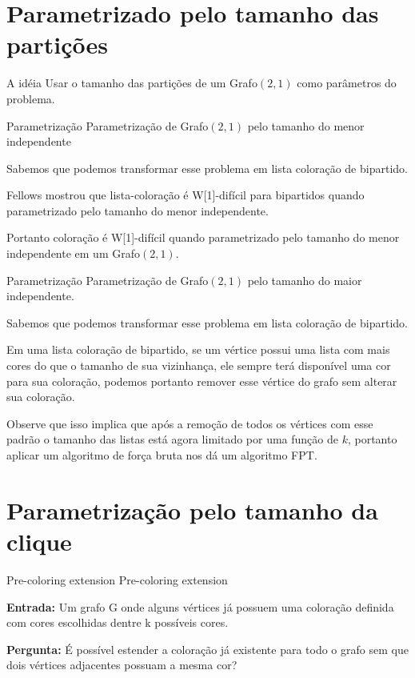 \documentclass[9pt, compress]{beamer}
\newcommand{\?}{\textcolor{warn}{\textit{?}}}
\begin{document}
    \section{Parametrizado pelo tamanho das partições}
    \begin{frame}{A idéia}
          Usar o tamanho das partições de um Grafo$(2,1)$ como parâmetros do problema.
    \end{frame}
    \begin{frame}{Parametrização}
      \large{Parametrização de Grafo$(2,1)$ pelo tamanho do menor independente}
      \normalsize\newline\newline
            
      Sabemos que podemos transformar esse problema em lista coloração de bipartido.
      
      Fellows mostrou que lista-coloração é W[1]-difícil para bipartidos quando parametrizado pelo tamanho do menor independente.
      
      Portanto coloração é W[1]-difícil quando parametrizado pelo tamanho do menor independente em um Grafo$(2,1)$.
    \end{frame}
    \begin{frame}{Parametrização}
    \large{Parametrização de Grafo$(2,1)$ pelo tamanho do maior independente.}
      \normalsize\newline\newline
            
      Sabemos que podemos transformar esse problema em lista coloração de bipartido.
      
      Em uma lista coloração de bipartido, se um vértice possui uma lista com mais cores do que o tamanho de sua vizinhança, ele sempre terá disponível uma cor para sua coloração, podemos portanto remover esse vértice do grafo sem alterar sua coloração.
      
      Observe que isso implica que após a remoção de todos os vértices com esse padrão o tamanho das listas está agora limitado por uma função de $k$, portanto aplicar um algoritmo de força bruta nos dá um algoritmo FPT.
     \end{frame}
     
    \section{Parametrização pelo tamanho da clique}
     \begin{frame}{Pre-coloring extension}
      \large{Pre-coloring extension}
      \normalsize\newline\newline
      
	      \textbf{Entrada:}  Um grafo G onde alguns vértices já possuem uma coloração definida com cores escolhidas dentre k possíveis cores.
	      
	      \textbf{Pergunta:}  É possível estender a coloração já existente para todo o grafo sem que dois vértices adjacentes possuam a mesma cor?
     \end{frame}
     
\end{document}
